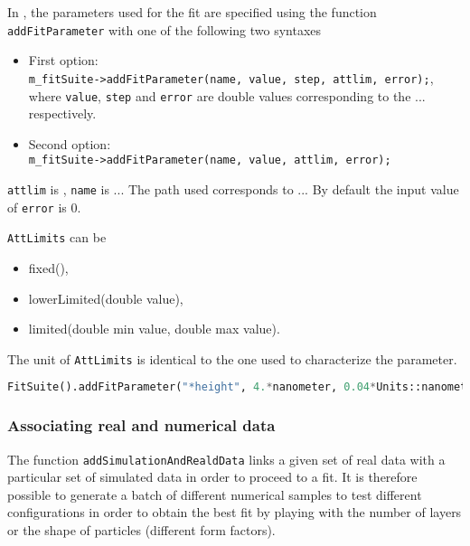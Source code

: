 In \BornAgain, the parameters used for the fit are specified using the
function \texttt{addFitParameter} with one of the following two syntaxes

\begin{itemize}
\item First option: \\ \texttt{m\_fitSuite->addFitParameter(name, value, step, attlim, error);},
where \texttt{value}, \texttt{step} and \texttt{error} are double values corresponding to the ... respectively.
\item Second option: \\
\texttt{m\_fitSuite->addFitParameter(name, value, attlim, error);}
\end{itemize}

\texttt{attlim} is , \texttt{name} is ... The path used corresponds to ...
By default the input value of \texttt{error} is 0.

\texttt{AttLimits} can be
\begin{itemize}
\item fixed(), 
\item lowerLimited(double value), 
\item limited(double min value, double max value).
\end{itemize}
The unit of \texttt{AttLimits} is identical to the one used to characterize the
parameter.

\begin{lstlisting}[language=python, style=eclipse,numbers=none]
FitSuite().addFitParameter("*height", 4.*nanometer, 0.04*Units::nanometer, AttLimits::lowerLimited(0.01) )
\end{lstlisting}




\subsubsection{Associating real and numerical data}
The function \texttt{addSimulationAndRealdData} links a given set of real data with a
  particular set of simulated data in order to proceed to a fit. It is
  therefore possible to generate a batch of different numerical
  samples to test different configurations in order to obtain the best
  fit by playing with the number of layers or the shape of particles
  (different form factors). 

